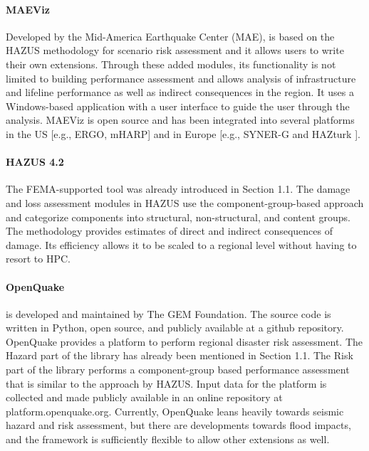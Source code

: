 \paragraph{MAEViz} 
Developed by the Mid-America Earthquake Center (MAE),  is based on the HAZUS methodology for scenario risk assessment and it allows users to write their own extensions. Through these added modules, its functionality is not limited to building performance assessment and allows analysis of infrastructure and lifeline performance as well as indirect consequences in the region. It uses a Windows-based application with a user interface to guide the user through the analysis. MAEViz is open source and has been integrated into several platforms in the US [e.g., ERGO, mHARP] and in Europe [e.g., SYNER-G \citep{pitilakis2014synerg} and HAZturk \citep{karaman2008earthquake}].

\paragraph{HAZUS 4.2} The FEMA-supported  tool was already introduced in Section 1.1. The damage and loss assessment modules in HAZUS use the component-group-based approach and categorize components into structural, non-structural, and content groups. The methodology provides estimates of direct and indirect consequences of damage. Its efficiency allows it to be scaled to a regional level without having to resort to HPC.

\paragraph{OpenQuake} 
 is developed and maintained by The GEM Foundation. The source code is written in Python, open source, and publicly available at a github repository. OpenQuake provides a platform to perform regional disaster risk assessment. The Hazard part of the library has already been mentioned in Section 1.1. The Risk part of the library performs a component-group based performance assessment that is similar to the approach by HAZUS. Input data for the platform is collected and made publicly available in an online repository at platform.openquake.org. Currently, OpenQuake leans heavily towards seismic hazard and risk assessment, but there are developments towards flood impacts, and the framework is sufficiently flexible to allow other extensions as well.

